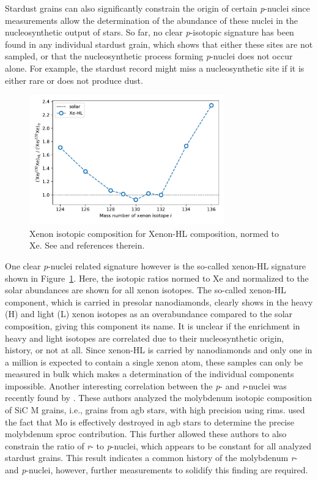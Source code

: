 Stardust grains can also significantly constrain the origin of certain \textit{p}-nuclei since measurements allow the determination of the abundance of these nuclei in the nucleosynthetic output of stars. So far, no clear \textit{p}-isotopic signature has been found in any individual stardust grain, which shows that either these sites are not sampled, or that the nucleosynthetic process forming \textit{p}-nuclei does not occur alone. For example, the stardust record might miss a nucleosynthetic site if it is either rare or does not produce dust. 
\begin{figure}[tb]
    \centering
    \includegraphics[width=0.75\textwidth]{graphics/p-nuclei/xenon-hl}
    \caption{Xenon isotopic composition for Xenon-HL composition, normed to Xe. See \citet{gilmour10} and references therein.}
    \label{fig:p-nuclei:xenon-HL_gilmour}
\end{figure}
One clear \textit{p}-nuclei related signature however is the so-called xenon-HL signature shown in Figure~\ref{fig:p-nuclei:xenon-HL_gilmour}. Here, the    isotopic ratios normed to Xe and normalized to the solar abundances are shown for all xenon isotopes. The so-called xenon-HL component, which is carried in presolar nanodiamonds, clearly shows in the heavy (H) and light (L) xenon isotopes as an overabundance compared to the solar composition, giving this component its name. It is unclear if the enrichment in heavy and light isotopes are correlated due to their nucleosynthetic origin, history, or not at all. Since xenon-HL is carried by nanodiamonds and only one in a million is expected to contain a single xenon atom, these samples can only be measured in bulk which makes a determination of the individual components impossible. Another interesting correlation between the \textit{p}- and \textit{r}-nuclei was recently found by \citet{stephan19}. These authors analyzed the molybdenum isotopic composition of SiC M grains, i.e., grains from \ac{agb} stars, with high precision using \ac{rims}. \citet{stephan19} used the fact that Mo is effectively destroyed in \ac{agb} stars to determine the precise molybdenum \ac{sproc} contribution. This further allowed these authors to also constrain the ratio of \textit{r}- to \textit{p}-nuclei, which appears to be constant for all analyzed stardust grains. This result indicates a common history of the molybdenum \textit{r}- and \textit{p}-nuclei, however, further measurements to solidify this finding are required.




